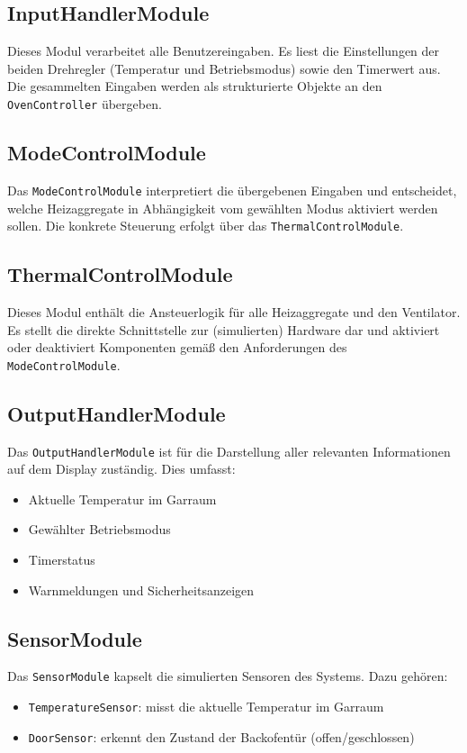 \documentclass[a4paper,12pt]{article}
\begin{document}
\subsection*{InputHandlerModule}
Dieses Modul verarbeitet alle Benutzereingaben. Es liest die Einstellungen der beiden Drehregler (Temperatur und Betriebsmodus) sowie den Timerwert aus. Die gesammelten Eingaben werden als strukturierte Objekte an den \texttt{OvenController} übergeben.

\subsection*{ModeControlModule}
Das \texttt{ModeControlModule} interpretiert die übergebenen Eingaben und entscheidet, welche Heizaggregate in Abhängigkeit vom gewählten Modus aktiviert werden sollen. Die konkrete Steuerung erfolgt über das \texttt{ThermalControlModule}.

\subsection*{ThermalControlModule}
Dieses Modul enthält die Ansteuerlogik für alle Heizaggregate und den Ventilator. Es stellt die direkte Schnittstelle zur (simulierten) Hardware dar und aktiviert oder deaktiviert Komponenten gemäß den Anforderungen des \texttt{ModeControlModule}.

\subsection*{OutputHandlerModule}
Das \texttt{OutputHandlerModule} ist für die Darstellung aller relevanten Informationen auf dem Display zuständig. Dies umfasst:
\begin{itemize}
    \item Aktuelle Temperatur im Garraum
    \item Gewählter Betriebsmodus
    \item Timerstatus
    \item Warnmeldungen und Sicherheitsanzeigen
\end{itemize}

\subsection*{SensorModule}
Das \texttt{SensorModule} kapselt die simulierten Sensoren des Systems. Dazu gehören:
\begin{itemize}
    \item \texttt{TemperatureSensor}: misst die aktuelle Temperatur im Garraum
    \item \texttt{DoorSensor}: erkennt den Zustand der Backofentür (offen/geschlossen)
\end{itemize}
\end{document}
